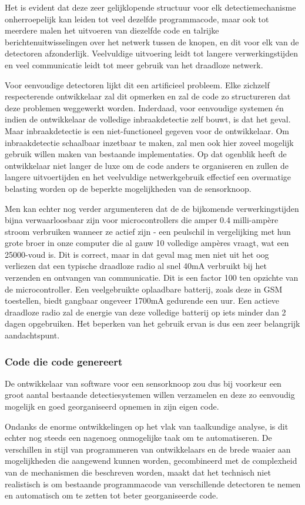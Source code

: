 \documentclass[DIV=calc,paper=a4,fontsize=11pt,twocolumn]{scrartcl}
\newcommand{\heading}[1]{
\subsubsection*{#1}
\vspace{-2mm}
}
\begin{document}
Het is evident dat deze zeer gelijklopende structuur voor elk
detectiemechanisme onherroepelijk kan leiden tot veel dezelfde programmacode,
maar ook tot meerdere malen het uitvoeren van diezelfde code en talrijke
berichtenuitwisselingen over het netwerk tussen de knopen, en dit voor elk van
de detectoren afzonderlijk. Veelvuldige uitvoering leidt tot langere
verwerkingstijden en veel communicatie leidt tot meer gebruik van het draadloze
netwerk.

Voor eenvoudige detectoren lijkt dit een artificieel probleem. Elke zichzelf
respecterende ontwikkelaar zal dit opmerken en zal de code zo structureren dat
deze problemen weggewerkt worden. Inderdaad, voor eenvoudige systemen \'en
indien de ontwikkelaar de volledige inbraakdetectie zelf bouwt, is dat het
geval. Maar inbraakdetectie is een niet-functioneel gegeven voor de
ontwikkelaar. Om inbraakdetectie schaalbaar inzetbaar te maken, zal men ook
hier zoveel mogelijk gebruik willen maken van bestaande implementaties. Op dat
ogenblik heeft de ontwikkelaar niet langer de luxe om de code anders te
organiseren en zullen de langere uitvoertijden en het veelvuldige
netwerkgebruik effectief een overmatige belasting worden op de beperkte
mogelijkheden van de sensorknoop.

Men kan echter nog verder argumenteren dat de de bijkomende verwerkingstijden
bijna verwaarloosbaar zijn voor microcontrollers die amper 0.4 milli-amp\`ere
stroom verbruiken wanneer ze actief zijn - een peulschil in vergelijking met
hun grote broer in onze computer die al gauw 10 volledige amp\`eres vraagt, wat
een 25000-voud is. Dit is correct, maar in dat geval mag men niet uit het oog
verliezen dat een typische draadloze radio al snel 40mA verbruikt bij het
verzenden en ontvangen van communicatie. Dit is een factor 100 ten opzichte van
de microcontroller. Een veelgebruikte oplaadbare batterij, zoals deze in GSM
toestellen, biedt gangbaar ongeveer 1700mA gedurende een uur. Een actieve
draadloze radio zal de energie van deze volledige batterij op iets minder dan 2
dagen opgebruiken. Het beperken van het gebruik ervan is dus een zeer
belangrijk aandachtspunt.

\heading{Code die code genereert}

De ontwikkelaar van software voor een sensorknoop zou dus bij voorkeur een
groot aantal bestaande detectiesystemen willen verzamelen en deze zo eenvoudig
mogelijk en goed georganiseerd opnemen in zijn eigen code.

Ondanks de enorme ontwikkelingen op het vlak van taalkundige analyse, is dit
echter nog steeds een nagenoeg onmogelijke taak om te automatiseren. De
verschillen in stijl van programmeren van ontwikkelaars en de brede waaier aan
mogelijkheden die aangewend kunnen worden, gecombineerd met de complexheid van
de mechanismen die beschreven worden, maakt dat het technisch niet realistisch
is om bestaande programmacode van verschillende detectoren te nemen en
automatisch om te zetten tot beter georganiseerde code.
\end{document}
